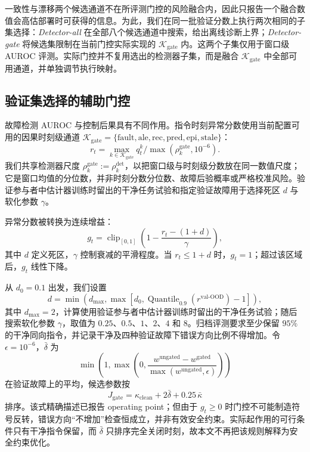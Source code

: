 \documentclass[UTF8]{ctexart}
\begin{document}
一致性与漂移两个候选通道不在所评测门控的风险融合内，因此只报告一个融合数值会高估部署时可获得的信息。为此，我们在同一批验证分数上执行两次相同的子集选择：\emph{Detector-all} 在全部八个候选通道中搜索，给出离线诊断上界；\emph{Detector-gate} 将候选集限制在当前门控实际实现的 $\mathcal{K}_{\mathrm{gate}}$ 内。这两个子集仅用于窗口级 AUROC 评测。实际门控并不复用选出的检测器子集，而是融合 $\mathcal{K}_{\mathrm{gate}}$ 中全部可用通道，并单独调节执行映射。

\subsection{验证集选择的辅助门控}

故障检测 AUROC 与控制后果具有不同作用。指令时刻异常分数使用当前配置可用的因果时刻级通道 $\mathcal{K}_{\mathrm{gate}}=\{\mathrm{fault},\mathrm{ale},\mathrm{rec},\mathrm{pred},\mathrm{epi},\mathrm{stale}\}$：
\begin{equation}
    r_t=\max_{k\in\mathcal{K}_{\mathrm{gate}}}
    q_t^k/\max(\rho_k^{\mathrm{gate}},10^{-6}).
\end{equation}
我们共享检测器尺度 $\rho_k^{\mathrm{gate}}:=\rho_k^{\mathrm{det}}$，以把窗口级与时刻级分数放在同一数值尺度；它是窗口均值的分位数，并非时刻分数分位数、故障后验概率或严格校准风险。验证参与者中估计器训练时留出的干净任务试验和指定验证故障用于选择死区 $d$ 与软化参数 $\gamma$。

异常分数被转换为连续增益：
\begin{equation}
g_t = \operatorname{clip}_{[0,1]}\!\left(
1-\frac{r_t-(1+d)}{\gamma}\right),
\end{equation}
其中 $d$ 定义死区，$\gamma$ 控制衰减的平滑程度。当 $r_t\leq1+d$ 时，$g_t=1$；超过该区域后，$g_t$ 线性下降。

从 $d_0=0.1$ 出发，我们设置
\begin{equation}
    d=\min\!\left(d_{\max},\max\left[d_0,
    \operatorname{Quantile}_{0.9}(r^{\mathrm{val\text{-}OOD}})-1\right]\right),
\end{equation}
其中 $d_{\max}=2$，计算使用验证参与者中估计器训练时留出的干净任务试验；随后搜索软化参数 $\gamma$，取值为 $0.25$、$0.5$、$1$、$2$、$4$ 和 $8$。归档评测要求至少保留 $95\%$ 的干净同向指令，并记录干净及四种验证故障下错误方向比例不得增加。令 $\epsilon=10^{-6}$，$\bar\delta$ 为
\[
\min\!\left(1,\max\!\left(0,\frac{w^{\mathrm{ungated}}-w^{\mathrm{gated}}}{\max(w^{\mathrm{ungated}},\epsilon)}\right)\right)
\]
在验证故障上的平均，候选参数按
\begin{equation}
    J_{\mathrm{gate}} = \kappa_{\mathrm{clean}} + 2\bar\delta + 0.25\,\bar\kappa
\end{equation}
排序。该式精确描述已报告 operating point；但由于 $g_t\geq0$ 时门控不可能制造符号反转，错误方向“不增加”检查恒成立，并非有效安全约束。实际起作用的可行条件只有干净指令保留，而 $\bar\delta$ 只排序完全关闭时刻，故本文不再把该规则解释为安全约束优化。
\end{document}
